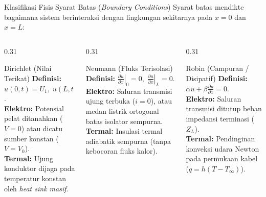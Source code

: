 \documentclass[aspectratio=169,10pt]{beamer}
\begin{document}
\begin{frame}{Klasifikasi Fisis Syarat Batas (\textit{Boundary Conditions})}
  Syarat batas mendikte bagaimana sistem berinteraksi dengan lingkungan sekitarnya pada $x = 0$ dan $x = L$:
  \vspace{0.1cm}
  \begin{columns}[t]
    \begin{column}{0.31\textwidth}
      \begin{block}{Dirichlet (Nilai Terikat)}
        \small
        \textbf{Definisi:} $u(0, t) = U_1, \; u(L, t) = U_2$.\\
        \textbf{Elektro:} Potensial pelat ditanahkan ($V = 0$) atau dicatu sumber konstan ($V = V_0$).\\
        \textbf{Termal:} Ujung konduktor dijaga pada temperatur konstan oleh \textit{heat sink masif}.
      \end{block}
    \end{column}
    \begin{column}{0.31\textwidth}
      \begin{alertblock}{Neumann (Fluks Terisolasi)}
        \small
        \textbf{Definisi:} $\left.\frac{\partial u}{\partial x}\right|_0 = 0, \; \left.\frac{\partial u}{\partial x}\right|_L = 0$.\\
        \textbf{Elektro:} Saluran transmisi ujung terbuka ($i = 0$), atau medan listrik ortogonal batas isolator sempurna.\\
        \textbf{Termal:} Insulasi termal adiabatik sempurna (tanpa kebocoran fluks kalor).
      \end{alertblock}
    \end{column}
    \begin{column}{0.31\textwidth}
      \begin{exampleblock}{Robin (Campuran / Disipatif)}
        \small
        \textbf{Definisi:} $\alpha u + \beta \frac{\partial u}{\partial x} = 0$.\\
        \textbf{Elektro:} Saluran transmisi ditutup beban impedansi terminasi ($Z_L$).\\
        \textbf{Termal:} Pendinginan konveksi udara Newton pada permukaan kabel ($\dot{q} = h(T - T_\infty)$).
      \end{exampleblock}
    \end{column}
  \end{columns}
\end{frame}
\end{document}
